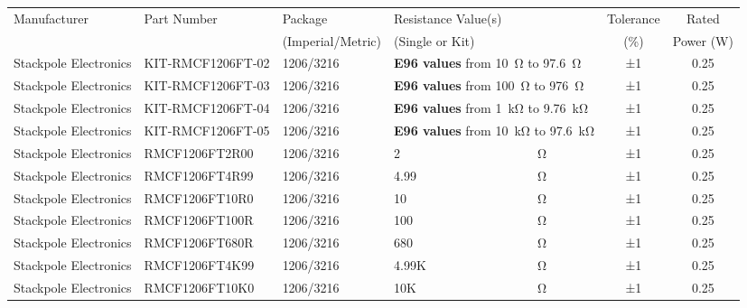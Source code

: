 \begin{tabular}{lllllcc}
Manufacturer & Part Number      & Package & \multicolumn{2}{l}{Resistance Value(s)} & Tolerance  & Rated  \\
 & & (Imperial/Metric) & \multicolumn{2}{l}{(Single or Kit)} & (\%) & Power (W) \\
\hline
Stackpole Electronics        & KIT-RMCF1206FT-02 & 1206/3216              & \multicolumn{2}{l}{\textbf{E96 values} from \SI{10}{\ohm} to \SI{97.6}{\ohm}} & ±1 & 0.25    \\
Stackpole Electronics        & KIT-RMCF1206FT-03 & 1206/3216              & \multicolumn{2}{l}{\textbf{E96 values} from \SI{100}{\ohm} to \SI{976}{\ohm}} & ±1 & 0.25    \\
Stackpole Electronics        & KIT-RMCF1206FT-04 & 1206/3216              & \multicolumn{2}{l}{\textbf{E96 values} from \SI{1}{\kilo\ohm} to \SI{9.76}{\kilo\ohm}} & ±1 & 0.25    \\
Stackpole Electronics        & KIT-RMCF1206FT-05 & 1206/3216              & \multicolumn{2}{l}{\textbf{E96 values} from \SI{10}{\kilo\ohm} to \SI{97.6}{\kilo\ohm}} & ±1 & 0.25    \\
\hline
Stackpole Electronics        & RMCF1206FT2R00   & 1206/3216                 & 2            & Ω            & ±1           & 0.25               \\
Stackpole Electronics        & RMCF1206FT4R99   & 1206/3216                 & 4.99             & Ω            & ±1           & 0.25               \\
Stackpole Electronics        & RMCF1206FT10R0   & 1206/3216                 & 10              & Ω            & ±1           & 0.25               \\
Stackpole Electronics        & RMCF1206FT100R   & 1206/3216                 & 100              & Ω            & ±1           & 0.25               \\
Stackpole Electronics        & RMCF1206FT680R   & 1206/3216                 & 680              & Ω            & ±1           & 0.25               \\
Stackpole Electronics        & RMCF1206FT4K99   & 1206/3216                 & 4.99K              & Ω            & ±1           & 0.25               \\
Stackpole Electronics        & RMCF1206FT10K0   & 1206/3216                 & 10K              & Ω            & ±1           & 0.25               \\
\hline
\end{tabular}